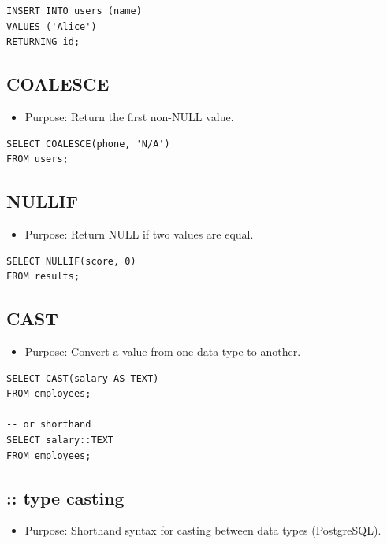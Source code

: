 \documentclass[10pt]{article}
\begin{document}
\begin{verbatim}
INSERT INTO users (name)
VALUES ('Alice')
RETURNING id;
\end{verbatim}

\subsection{COALESCE}
\begin{itemize}
    \item Purpose: Return the first non-NULL value.
\end{itemize}

\begin{verbatim}
SELECT COALESCE(phone, 'N/A')
FROM users;
\end{verbatim}

\subsection{NULLIF}
\begin{itemize}
    \item Purpose: Return NULL if two values are equal.
\end{itemize}

\begin{verbatim}
SELECT NULLIF(score, 0)
FROM results;
\end{verbatim}

\subsection{CAST}
\begin{itemize}
    \item Purpose: Convert a value from one data type to another.
\end{itemize}

\begin{verbatim}
SELECT CAST(salary AS TEXT)
FROM employees;

-- or shorthand
SELECT salary::TEXT
FROM employees;
\end{verbatim}

\subsection{:: type casting}
\begin{itemize}
    \item Purpose: Shorthand syntax for casting between data types (PostgreSQL).
\end{itemize}
\end{document}

